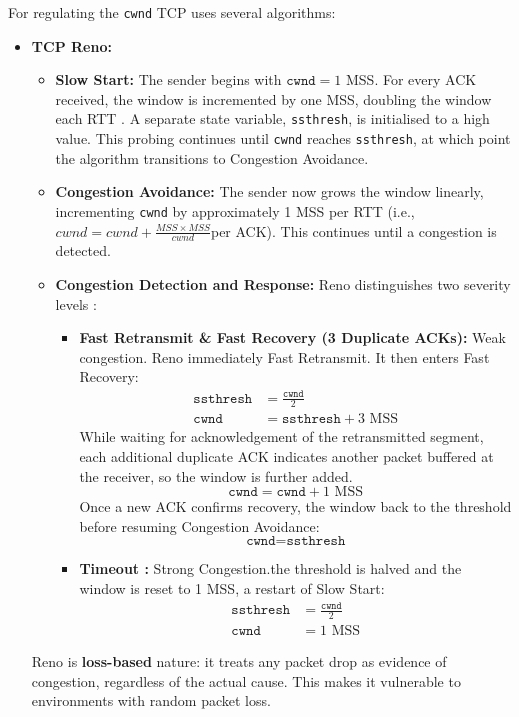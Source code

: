 \documentclass[12pt,a4paper]{article}
\begin{document}
For regulating the \texttt{cwnd} TCP uses several algorithms:
\begin{itemize}
    \item \textbf{TCP Reno:} 
    \begin{itemize}
        \item \textbf{Slow Start:} The sender begins with $\texttt{cwnd} = 1$ MSS. For every ACK received, the window is incremented by one MSS,  doubling the window each RTT . A separate state variable, \texttt{ssthresh}, is initialised to a high value. This probing continues until \texttt{cwnd} reaches \texttt{ssthresh}, at which point the algorithm transitions to Congestion Avoidance.

        \item \textbf{Congestion Avoidance:} The sender now grows the window linearly, incrementing \texttt{cwnd} by approximately 1 MSS per RTT (i.e., $cwnd = cwnd + \frac{MSS \times MSS}{cwnd}$per ACK). This  continues until a congestion is detected.

        \item \textbf{Congestion Detection and Response:}  Reno distinguishes two severity levels \cite[p.~783]{forouzan2013}:
        \begin{itemize}
            \item \textbf{Fast Retransmit \& Fast Recovery (3 Duplicate ACKs):} Weak congestion. Reno immediately Fast Retransmit. It then enters Fast Recovery: 
            \begin{align*}
                \texttt{ssthresh} &= \frac{\texttt{cwnd}}{2} \\
                \texttt{cwnd}     &= \texttt{ssthresh} + 3 \text{ MSS}
            \end{align*}
            While waiting for acknowledgement of the retransmitted segment, each additional duplicate ACK indicates another packet buffered at the receiver, so the window is further added.
            \[ \texttt{cwnd} = \texttt{cwnd} + 1 \text{ MSS} \]
            Once a new ACK confirms recovery, the window back to the threshold before resuming Congestion Avoidance:
            \[ \texttt{cwnd} = \texttt{ssthresh} \]

            \item \textbf{Timeout :} Strong Congestion.the threshold is halved and the window is reset to 1 MSS,  a restart of Slow Start:
            \begin{align*}
                \texttt{ssthresh} &= \frac{\texttt{cwnd}}{2} \\
                \texttt{cwnd}     &= 1 \text{ MSS}
            \end{align*}
        \end{itemize}
    \end{itemize}
Reno is  \textbf{loss-based} nature: it treats any packet drop as  evidence of congestion, regardless of the actual cause. This makes it  vulnerable to environments with  random packet loss.


\end{itemize}
\end{document}
